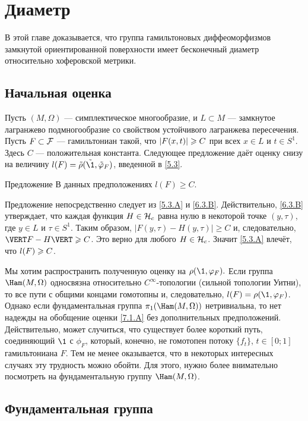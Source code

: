 \chapter{Диаметр}

В этой главе доказывается, что группа гамильтоновых диффеоморфизмов
замкнутой ориентированной поверхности имеет бесконечный диаметр
относительно хоферовской метрики. 

\section{Начальная оценка}
Пусть $(M, \Omega)$ — симплектическое многообразие, и $L \subset M$
— замкнутое лагранжево подмногообразие со свойством  устойчивого
лагранжева пересечения. 
Пусть $F \subset \mathcal{F}$ — гамильтониан такой, что $| F (x, t) | \z\ge C$
при всех $x \in L$ и $t \in S^1$. 
Здесь $C$ — положительная константа.
Следующее предложение даёт оценку снизу на величину $l (F) \z=
\tilde\rho (\tilde\1, \tilde\phi_F)$, введенной в \ref{5.3}. 

\begin{thm}{Предложение}\label{7.1.A}
В данных предположениях $l (F) \ge C$.
\end{thm}

Предложение непосредственно следует из \ref{5.3.A} и \ref{6.3.B}.
Действительно, \ref{6.3.B} утверждает, что каждая функция $H \z\in \H_c$ равна нулю в некоторой точке $(y, \tau)$, где $y \in L$ и $\tau \in S^1$.
Таким образом, $| F (y, \tau) - H (y, \tau) | \ge C$ и, следовательно, $\VERT F - H \VERT \z\ge C$.
Это верно для любого $H \in \mathcal{H}_c$.
Значит \ref{5.3.A} влечёт, что $l (F) \z\ge C$.
\qeds

Мы хотим распространить полученную оценку на $\rho (\1, \phi_F).$
Если группа $\Ham (M, \Omega)$ односвязна относительно
$C^\infty$-топологии (сильной топологии Уитни), то все пути с общими
концами гомотопны и, следовательно, $l (F) = \rho (\1, \phi_F)$. 
Однако если фундаментальная группа $\pi_1 (\Ham (M, \Omega))$
нетривиальна, то нет надежды на обобщение оценки \ref{7.1.A} без
дополнительных предположений. 
Действительно, может случиться, что существует более короткий путь, соединяющий $\1$ с $\phi_F$, который,
конечно, не гомотопен потоку $\{f_t\}$, $t \in [0; 1]$ гамильтониана
$F$. 
Тем не менее оказывается, что в некоторых интересных случаях эту трудность можно обойти.
Для этого, нужно более внимательно посмотреть на фундаментальную группу $\Ham (M, \Omega)$.

\section{Фундаментальная группа}


